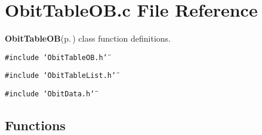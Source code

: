 \section{Obit\-Table\-OB.c File Reference}
\label{ObitTableOB_8c}
{\bf Obit\-Table\-OB}{\rm (p.\,\pageref{structObitTableOB})} class function definitions. 

{\tt \#include \char`\"{}Obit\-Table\-OB.h\char`\"{}}\par
{\tt \#include \char`\"{}Obit\-Table\-List.h\char`\"{}}\par
{\tt \#include \char`\"{}Obit\-Data.h\char`\"{}}\par
\subsection*{Functions}
